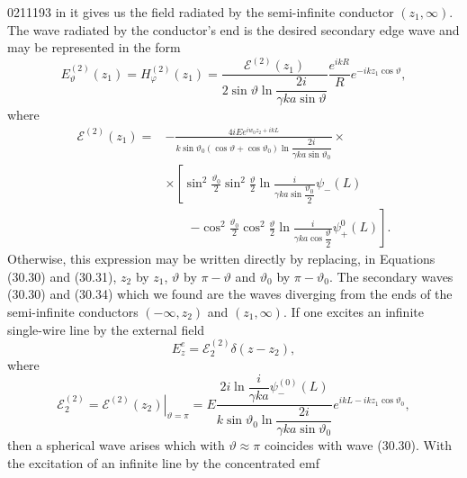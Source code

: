 \begin{scanpage}{0211}{193}
\noindent in it gives us the field radiated by the semi-infinite conductor $(z_1,\infty)$. The wave radiated by the conductor's end is the desired secondary edge wave and may be represented in the form
\[E_\vartheta^{(2)}(z_1)=H_\varphi^{(2)}(z_1)=\frac{\mathcal E^{(2)}(z_1)}{2\sin\vartheta\ln\dfrac{2i}{\gamma ka\sin\vartheta}}\frac{e^{ikR}}R e^{-ikz_1\cos\vartheta},\tag{30.34}\]
where
\[
\begin{aligned}
\mathcal E^{(2)}(z_1)={}&-\frac{4iE e^{iw_0z_2+ikL}}{k\sin\vartheta_0(\cos\vartheta+\cos\vartheta_0)\ln\dfrac{2i}{\gamma ka\sin\vartheta_0}}\times\\
&\times\left[\sin^2\frac{\vartheta_0}2\sin^2\frac\vartheta2\ln\frac{i}{\gamma ka\sin\dfrac{\vartheta_0}2}\psi_-(L)\right.\\
&\qquad\left.-\cos^2\frac{\vartheta_0}2\cos^2\frac\vartheta2\ln\frac{i}{\gamma ka\cos\dfrac\vartheta2}\psi_+^0(L)\right].
\end{aligned}\tag{30.35}
\]
Otherwise, this expression may be written directly by replacing, in Equations (30.30) and (30.31), $z_2$ by $z_1$, $\vartheta$ by $\pi-\vartheta$ and $\vartheta_0$ by $\pi-\vartheta_0$.
The secondary waves (30.30) and (30.34) which we found are the waves diverging from the ends of the semi-infinite conductors $(-\infty,z_2)$ and $(z_1,\infty)$. If one excites an infinite single-wire line by the external field
\[E_z^e=\mathcal E_2^{(2)}\delta(z-z_2),\tag{31.01}\]
where
\[\mathcal E_2^{(2)}=\left.\mathcal E^{(2)}(z_2)\right|_{\vartheta=\pi}
=E\frac{2i\ln\dfrac{i}{\gamma ka}\psi_-^{(0)}(L)}{k\sin\vartheta_0\ln\dfrac{2i}{\gamma ka\sin\vartheta_0}}e^{ikL-ikz_1\cos\vartheta_0},\tag{31.02}\]
then a spherical wave arises which with $\vartheta\approx\pi$ coincides with wave (30.30). With the excitation of an infinite line by the concentrated emf
\end{scanpage}
